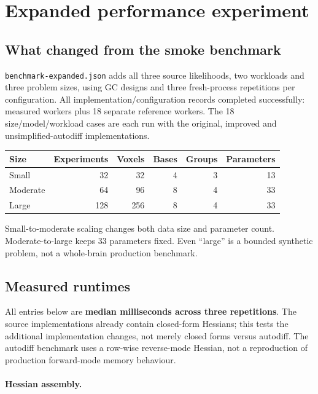 \documentclass[11pt,a4paper]{article}
\begin{document}
\section{Expanded performance experiment}
\subsection{What changed from the smoke benchmark}
\texttt{benchmark-expanded.json} adds all three source likelihoods, two workloads
and three problem sizes, using GC designs and three fresh-process repetitions
per configuration. All \ExpandedRecords{} implementation/configuration records
completed successfully: \ExpandedRuns{} measured workers plus 18 separate
reference workers. The 18 size/model/workload cases are each run with the
original, improved and unsimplified-autodiff implementations.

\begin{center}\small
\begin{tabular}{lrrrrr}
\toprule
Size & Experiments & Voxels & Bases & Groups & Parameters\\
\midrule
Small & 32 & 32 & 4 & 3 & 13\\
Moderate & 64 & 96 & 8 & 4 & 33\\
Large & 128 & 256 & 8 & 4 & 33\\
\bottomrule
\end{tabular}
\end{center}
Small-to-moderate scaling changes both data size and parameter count.
Moderate-to-large keeps 33 parameters fixed. Even ``large'' is a bounded
synthetic problem, not a whole-brain production benchmark.

\clearpage
\subsection{Measured runtimes}
All entries below are \textbf{median milliseconds across three repetitions}.
The source implementations already contain closed-form Hessians; this tests
the additional implementation changes, not merely closed forms versus autodiff.
The autodiff benchmark uses a row-wise reverse-mode Hessian, not a reproduction
of production forward-mode memory behaviour.

\paragraph{Hessian assembly.}
\begin{center}\small
\ExpandedHessianTable
\end{center}
\end{document}

